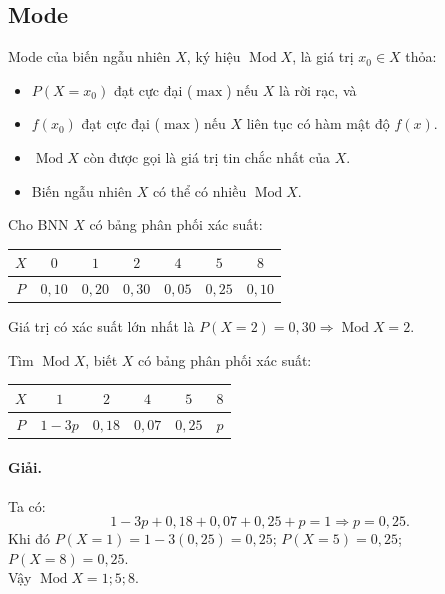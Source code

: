 \subsection{Mode}
Mode của biến ngẫu nhiên $X$, ký hiệu $\operatorname{Mod} X$, là giá trị $x_0 \in X$ thỏa:
\begin{itemize}
    \item $P(X = x_0)$ đạt cực đại ($\max$) nếu $X$ là rời rạc, và
    \item $f(x_0)$ đạt cực đại ($\max$) nếu $X$ liên tục có hàm mật độ $f(x)$.
\end{itemize}

\begin{chuy}
\begin{itemize}
    \item $\operatorname{Mod} X$ còn được gọi là giá trị tin chắc nhất của $X$.
    \item Biến ngẫu nhiên $X$ có thể có nhiều $\operatorname{Mod} X$.
\end{itemize}
\end{chuy}

\begin{vidu}[VD 1]
Cho BNN $X$ có bảng phân phối xác suất:
\begin{center}
\begin{tabular}{|c|c|c|c|c|c|c|}
\hline
$X$ & $0$ & $1$ & $2$ & $4$ & $5$ & $8$ \\
\hline
$P$ & $0{,}10$ & $0{,}20$ & $0{,}30$ & $0{,}05$ & $0{,}25$ & $0{,}10$ \\
\hline
\end{tabular}
\end{center}
Giá trị có xác suất lớn nhất là $P(X = 2) = 0{,}30 \Rightarrow \operatorname{Mod} X = 2$.
\end{vidu}

\begin{vidu}[VD 2]
Tìm $\operatorname{Mod} X$, biết $X$ có bảng phân phối xác suất:
\begin{center}
\begin{tabular}{|c|c|c|c|c|c|}
\hline
$X$ & $1$ & $2$ & $4$ & $5$ & $8$ \\
\hline
$P$ & $1 - 3p$ & $0{,}18$ & $0{,}07$ & $0{,}25$ & $p$ \\
\hline
\end{tabular}
\end{center}

\paragraph{Giải.} Ta có:
\[
1 - 3p + 0{,}18 + 0{,}07 + 0{,}25 + p = 1 \Rightarrow p = 0{,}25.
\]
Khi đó $P(X = 1) = 1 - 3(0{,}25) = 0{,}25$; $P(X = 5) = 0{,}25$; $P(X = 8) = 0{,}25$.\\
Vậy $\operatorname{Mod} X = 1; 5; 8$.
\end{vidu}

